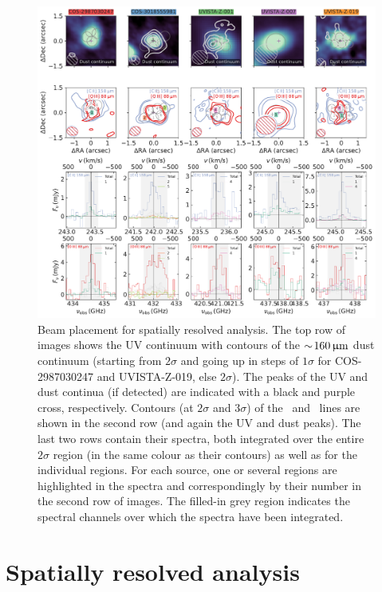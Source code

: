 \begin{figure}
    \centering
    \includegraphics[width=\linewidth]{"Plots/ChapterD/Dust_maps_spectra_clean"}
    \caption[Beam placement for spatially resolved analysis]
    {Beam placement for spatially resolved analysis. The top row of images shows the UV continuum with contours of the $\sim \! 160 \, \mathrm{\upmu m}$ dust continuum (starting from $2 \sigma$ and going up in steps of $1 \sigma$ for COS-2987030247 and UVISTA-Z-019, else $2 \sigma$). The peaks of the UV and dust continua (if detected) are indicated with a black and purple cross, respectively. Contours (at $2 \sigma$ and $3 \sigma$) of the \CIILam\ and \OIIILam\ lines are shown in the second row (and again the UV and dust peaks). The last two rows contain their spectra, both integrated over the entire $2 \sigma$ region (in the same colour as their contours) as well as for the individual regions. For each source, one or several regions are highlighted in the spectra and correspondingly by their number in the second row of images. The filled-in grey region indicates the spectral channels over which the spectra have been integrated.
    }
    \label{appDfig:Beam_placement_for_spatially_resolved_analysis}
\end{figure}

\section{Spatially resolved analysis}
\label{appDsec:Spatially_resolved_analysis}

